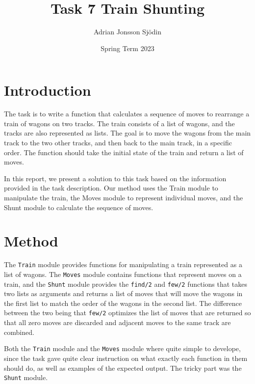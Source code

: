 \documentclass[a4paper,11pt]{article}
\begin{document}
\title{
    \textbf{Task 7 Train Shunting}
}
\author{Adrian Jonsson Sjödin}
\date{Spring Term 2023}

\maketitle

\section*{Introduction}
The task is to write a function that calculates a sequence of moves to rearrange a train of wagons on two tracks. 
The train consists of a list of wagons, and the tracks are also represented as lists. The goal is to move the wagons
from the main track to the two other tracks, and then back to the main track, in a specific order. The function should
take the initial state of the train and return a list of moves.

In this report, we present a solution to this task based on the information provided in the task description. Our method 
uses the Train module to manipulate the train, the Moves module to represent individual moves, and the Shunt module to 
calculate the sequence of moves.

\section*{Method}
The {\tt Train} module provides functions for manipulating a train represented as a list of wagons. The {\tt Moves} 
module contains functions that represent moves on a train, and the {\tt Shunt} module provides the {\tt find/2} and 
{\tt few/2} functions that takes two lists as arguments and returns a list of moves that will move the wagons in the 
first list to match the order of the wagons in the second list. The difference between the two being that {\tt few/2} 
optimizes the list of moves that are returned so that all zero moves are discarded and adjacent moves to the same track are
combined.

Both the {\tt Train} module and the {\tt Moves} module where quite simple to develope, since the task gave quite clear 
instruction on what exactly each function in them should do, as well as examples of the expected output. The tricky part 
was the {\tt Shunt} module.
\end{document}
